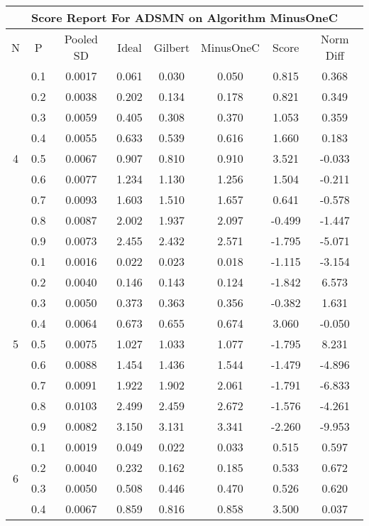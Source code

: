 \documentclass[11pt,a4paper]{report}
\begin{document}
\begin{longtable}{ | c | c || c | c | c | c | c | c | }
\hline
\multicolumn{8}{|c|}{ Score Report For ADSMN on Algorithm MinusOneC} \\
\hline
N & P & Pooled SD &  Ideal &  Gilbert & MinusOneC  & Score & Norm Diff \\
 \hline
 \hline
 \endhead
\multirow{9}{*}{4} & 0.1 & 0.0017 & 0.061 & 0.030 & 0.050 & 0.815 & 0.368 \\
 & 0.2 & 0.0038 & 0.202 & 0.134 & 0.178 & 0.821 & 0.349 \\
 & 0.3 & 0.0059 & 0.405 & 0.308 & 0.370 & 1.053 & 0.359 \\
 & 0.4 & 0.0055 & 0.633 & 0.539 & 0.616 & 1.660 & 0.183 \\
 & 0.5 & 0.0067 & 0.907 & 0.810 & 0.910 & 3.521 & -0.033 \\
 & 0.6 & 0.0077 & 1.234 & 1.130 & 1.256 & 1.504 & -0.211 \\
 & 0.7 & 0.0093 & 1.603 & 1.510 & 1.657 & 0.641 & -0.578 \\
 & 0.8 & 0.0087 & 2.002 & 1.937 & 2.097 & -0.499 & -1.447 \\
 & 0.9 & 0.0073 & 2.455 & 2.432 & 2.571 & -1.795 & -5.071 \\
 \hline
\multirow{9}{*}{5} & 0.1 & 0.0016 & 0.022 & 0.023 & 0.018 & -1.115 & -3.154 \\
 & 0.2 & 0.0040 & 0.146 & 0.143 & 0.124 & -1.842 & 6.573 \\
 & 0.3 & 0.0050 & 0.373 & 0.363 & 0.356 & -0.382 & 1.631 \\
 & 0.4 & 0.0064 & 0.673 & 0.655 & 0.674 & 3.060 & -0.050 \\
 & 0.5 & 0.0075 & 1.027 & 1.033 & 1.077 & -1.795 & 8.231 \\
 & 0.6 & 0.0088 & 1.454 & 1.436 & 1.544 & -1.479 & -4.896 \\
 & 0.7 & 0.0091 & 1.922 & 1.902 & 2.061 & -1.791 & -6.833 \\
 & 0.8 & 0.0103 & 2.499 & 2.459 & 2.672 & -1.576 & -4.261 \\
 & 0.9 & 0.0082 & 3.150 & 3.131 & 3.341 & -2.260 & -9.953 \\
 \hline
\multirow{9}{*}{6} & 0.1 & 0.0019 & 0.049 & 0.022 & 0.033 & 0.515 & 0.597 \\
 & 0.2 & 0.0040 & 0.232 & 0.162 & 0.185 & 0.533 & 0.672 \\
 & 0.3 & 0.0050 & 0.508 & 0.446 & 0.470 & 0.526 & 0.620 \\
 & 0.4 & 0.0067 & 0.859 & 0.816 & 0.858 & 3.500 & 0.037 \\

\end{longtable}
\end{document}
